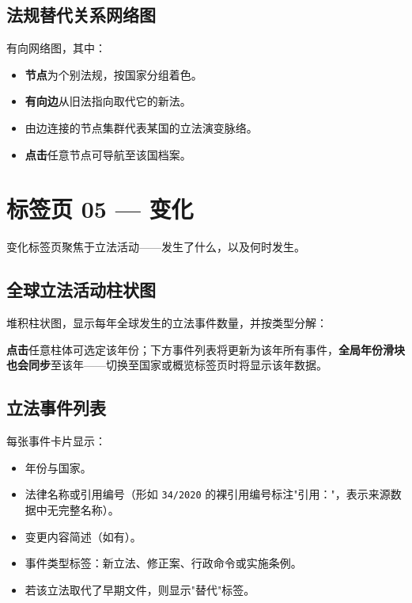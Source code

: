 \documentclass[12pt,a4paper]{article}
\newcommand{\badge}[2]{%
  \colorbox{#1}{\color{white}\footnotesize\textbf{\strut\,#2\,}}%
}
\begin{document}
\subsection{法规替代关系网络图}

有向网络图，其中：
\begin{itemize}
  \item \textbf{节点}为个别法规，按国家分组着色。
  \item \textbf{有向边}从旧法指向取代它的新法。
  \item 由边连接的节点集群代表某国的立法演变脉络。
  \item \textbf{点击}任意节点可导航至该国档案。
\end{itemize}

\section{标签页 05 — 变化}
\label{sec:changes}

变化标签页聚焦于立法活动——发生了什么，以及何时发生。

\subsection{全球立法活动柱状图}

堆积柱状图，显示每年全球发生的立法事件数量，并按类型分解：


\textbf{点击}任意柱体可选定该年份；下方事件列表将更新为该年所有事件，\textbf{全局年份滑块也会同步}至该年——切换至国家或概览标签页时将显示该年数据。

\subsection{立法事件列表}

每张事件卡片显示：
\begin{itemize}
  \item 年份与国家。
  \item 法律名称或引用编号（形如 \texttt{34/2020} 的裸引用编号标注"引用："，表示来源数据中无完整名称）。
  \item 变更内容简述（如有）。
  \item 事件类型标签：新立法、修正案、行政命令或实施条例。
  \item 若该立法取代了早期文件，则显示"替代"标签。
\end{itemize}
\end{document}
